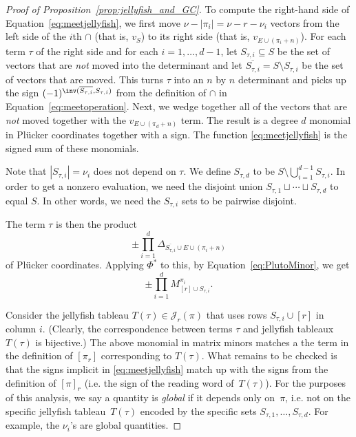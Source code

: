 \begin{proof}[Proof of Proposition~\ref{prop:jellyfish_and_GC}]
To compute the right-hand side of Equation~\eqref{eq:meetjellyfish}, we first move $\nu - |\pi_i| = \nu - r - \nu_i$ vectors from the left side of the $i$th $\cap$ (that is, $v_S$) to its right side (that is, $v_{E \cup (\pi_i + n)}$). For each term $\tau$ of the right side and for each $i=1,\dots,d-1$, let $S_{\tau,i} \subseteq S$ be the set of vectors that are \emph{not} moved into the determinant and let $\overline{S_{\tau,i}} = S \setminus S_{\tau,i}$ be the set of vectors that are moved. This turns $\tau$ into an $n$ by $n$ determinant and picks up the sign $(-1)^{\inv(\overline{S_{\tau,i}}, S_{\tau,i})}$ from the definition of $\cap$ in Equation~\eqref{eq:meetoperation}.
Next, we wedge together all of the vectors that are {\sl not} moved together with the $v_{E \cup (\pi_d+n)}$ term. The result is a degree $d$ monomial in Pl\"ucker coordinates together with a sign. The function \eqref{eq:meetjellyfish} is the signed sum of these monomials. 

Note that $|S_{\tau,i}| = \nu_i$ does not depend on $\tau$. We define $S_{\tau,d}$ to be $S \setminus \bigcup_{i=1}^{d-1}S_{\tau,i}$. In order to get a nonzero evaluation, we need the disjoint union $S_{\tau,1} \sqcup \cdots \sqcup S_{\tau, d}$ to  equal  $S$. In other words, we need the $S_{\tau,i}$ sets to be pairwise disjoint.

The term $\tau$ is then the product 
\begin{equation}
\pm \prod_{i=1}^d\Delta_{\overline{S_{\tau,i}} \cup E \cup (\pi_i+n)}
\end{equation}
of Pl\"ucker coordinates.
Applying $\Phi^*$ to this, by Equation~\eqref{eq:PlutoMinor}, we get 
\begin{equation}
\pm \prod_{i=1}^d M^{\pi_i}_{[r] \cup S_{\tau,i}}.
\end{equation}

Consider the jellyfish tableau $T(\tau) \in \mathcal{J}_r(\pi)$ that uses rows $S_{\tau,i} \cup [r]$ in column $i$. (Clearly, the correspondence between terms $\tau$ and jellyfish tableaux $T(\tau)$ is bijective.) The above monomial in matrix minors matches a the term in the definition of $[\pi_r]$ corresponding to $T(\tau)$. What remains to be checked is that the signs implicit in \eqref{eq:meetjellyfish} match up with the signs from the definition of $[\pi]_r$ (i.e. the sign of the reading word of~$T(\tau)$). For the purposes of this analysis, we say a quantity is \emph{global} if it depends only on~$\pi$, i.e. not on the specific jellyfish tableau~$T(\tau)$ encoded by the specific sets $S_{\tau,1},\dots,S_{\tau,d}$. For example, the $\nu_i$'s are global quantities. 


\end{proof}
